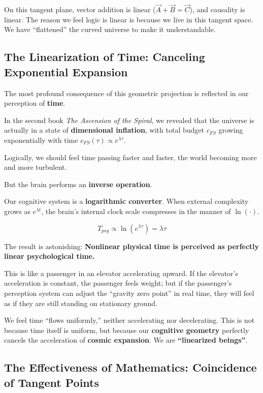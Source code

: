 \documentclass[11pt,a4paper,twoside]{book}
\begin{document}
On this tangent plane, vector addition is linear ($\vec{A} + \vec{B} = \vec{C}$), and causality is linear. The reason we feel logic is linear is because we live in this tangent space. We have ``flattened'' the curved universe to make it understandable.

\subsection{The Linearization of Time: Canceling Exponential Expansion}

The most profound consequence of this geometric projection is reflected in our perception of \textbf{time}.

In the second book \textit{The Ascension of the Spiral}, we revealed that the universe is actually in a state of \textbf{dimensional inflation}, with total budget $c_{FS}$ growing exponentially with time $c_{FS}(\tau) \propto e^{\lambda \tau}$.

Logically, we should feel time passing faster and faster, the world becoming more and more turbulent.

But the brain performs an \textbf{inverse operation}.

Our cognitive system is a \textbf{logarithmic converter}. When external complexity grows as $e^{\lambda t}$, the brain's internal clock scale compresses in the manner of $\ln(\cdot)$.

$$T_{psy} \propto \ln(e^{\lambda \tau}) = \lambda \tau$$

The result is astonishing: \textbf{Nonlinear physical time is perceived as perfectly linear psychological time.}

This is like a passenger in an elevator accelerating upward. If the elevator's acceleration is constant, the passenger feels weight; but if the passenger's perception system can adjust the ``gravity zero point'' in real time, they will feel as if they are still standing on stationary ground.

We feel time ``flows uniformly,'' neither accelerating nor decelerating. This is not because time itself is uniform, but because our \textbf{cognitive geometry} perfectly cancels the acceleration of \textbf{cosmic expansion}. We are \textbf{``linearized beings''}.

\subsection{The Effectiveness of Mathematics: Coincidence of Tangent Points}
\end{document}
